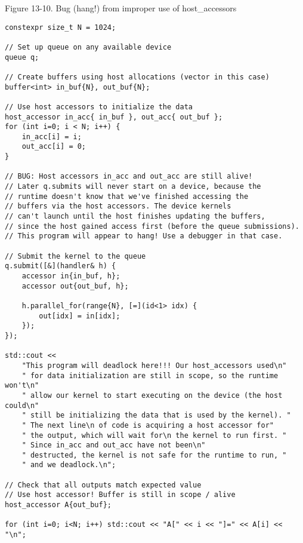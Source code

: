 \hspace*{\fill} \par %
Figure 13-10. Bug (hang!) from improper use of host\_accessors
\begin{lstlisting}[caption={}]
constexpr size_t N = 1024;

// Set up queue on any available device
queue q;

// Create buffers using host allocations (vector in this case)
buffer<int> in_buf{N}, out_buf{N};

// Use host accessors to initialize the data
host_accessor in_acc{ in_buf }, out_acc{ out_buf };
for (int i=0; i < N; i++) {
	in_acc[i] = i;
	out_acc[i] = 0;
}

// BUG: Host accessors in_acc and out_acc are still alive!
// Later q.submits will never start on a device, because the
// runtime doesn't know that we've finished accessing the
// buffers via the host accessors. The device kernels
// can't launch until the host finishes updating the buffers,
// since the host gained access first (before the queue submissions).
// This program will appear to hang! Use a debugger in that case.

// Submit the kernel to the queue
q.submit([&](handler& h) {
	accessor in{in_buf, h};
	accessor out{out_buf, h};
	
	h.parallel_for(range{N}, [=](id<1> idx) {
		out[idx] = in[idx];
	});
});

std::cout <<
	"This program will deadlock here!!! Our host_accessors used\n"
	" for data initialization are still in scope, so the runtime won't\n"
	" allow our kernel to start executing on the device (the host could\n"
	" still be initializing the data that is used by the kernel). "
	" The next line\n of code is acquiring a host accessor for"
	" the output, which will wait for\n the kernel to run first. "
	" Since in_acc and out_acc have not been\n"
	" destructed, the kernel is not safe for the runtime to run, "
	" and we deadlock.\n";
	
// Check that all outputs match expected value
// Use host accessor! Buffer is still in scope / alive
host_accessor A{out_buf};

for (int i=0; i<N; i++) std::cout << "A[" << i << "]=" << A[i] << "\n";
\end{lstlisting}












































